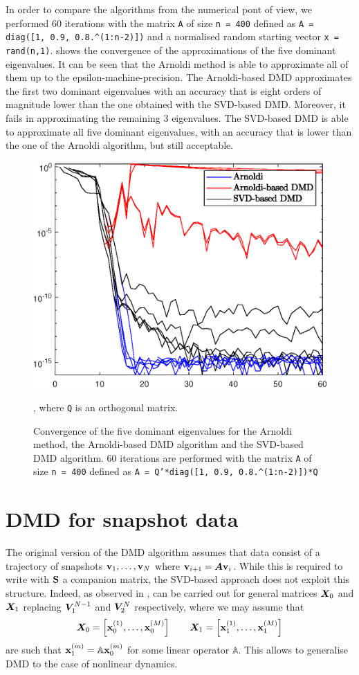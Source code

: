 In order to compare the algorithms from the numerical pont of view, we performed 60 iterations with the matrix \texttt{A} of size \texttt{n = 400} defined as \texttt{A = diag([1, 0.9, 0.8.\^{}(1:n-2)])} and a normalised random starting vector \texttt{x = rand(n,1)}.  shows the convergence of the approximations of the five dominant eigenvalues. It can be seen that the Arnoldi method is able to approximate all of them up to the epsilon-machine-precision. The Arnoldi-based DMD approximates the first two dominant eigenvalues with an accuracy that is eight orders of magnitude lower than the one obtained with the SVD-based DMD. Moreover, it fails in approximating the remaining 3 eigenvalues. The SVD-based DMD is able to approximate all five dominant eigenvalues, with an accuracy that is lower than the one of the Arnoldi algorithm, but still acceptable. 
\begin{figure}[h]
    \centering
    \includegraphics[width=0.5\linewidth]{../code/figures/Arnoldi_vs_DMD.eps}
    \caption{Convergence of the five dominant eigenvalues for the Arnoldi method, the Arnoldi-based DMD algorithm and the SVD-based DMD algorithm. 60 iterations are performed with the matrix \texttt{A} of size \texttt{n = 400} defined as \texttt{A = Q'*diag([1, 0.9, 0.8.\^{}(1:n-2)])*Q}}, where \texttt{Q} is an orthogonal matrix.
    \label{fig_arnoldi_vs_DMD}
\end{figure}

\section{DMD for snapshot data}
\label{section_dmd_koopman}
The original version of the DMD algorithm \cite{schmid_dynamic_2010} assumes that data consist of a trajectory of snapshots $\vb{v}_1, \dots, \vb{v}_N$ where $\vb{v}_{i+1} = \vb*{A}\vb{v}_{i}$. While this is required to write  with $\vb{S}$ a companion matrix, the SVD-based approach does not exploit this structure. Indeed, as observed in \cite{tu_dynamic_2014},  can be carried out for general matrices $\vb*{X}_0$ and $\vb*{X}_1$ replacing $\vb*{V}_1^{N-1}$ and $\vb*{V}_2^{N}$ respectively, where we may assume that
\begin{equation}
    \label{dmd_matrices}
    \vb*{X}_0 = \left[\vb{x}_0^{(1)}, \dots, \vb{x}_0^{(M)}\right] \qquad \vb*{X}_1 = \left[\vb{x}_1^{(1)}, \dots, \vb{x}_1^{(M)}\right]
\end{equation}
are such that $\vb{x}_1^{(m)} = \mathbb{A}\vb{x}_0^{(m)}$ for some linear operator $\mathbb{A}$. This allows to generalise DMD to the case of nonlinear dynamics.

